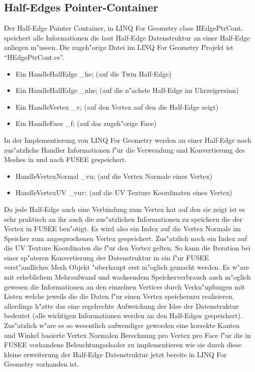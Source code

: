 \documentclass[pagesize, paper=a4, fontsize=12pt,titlepage=true, headings=small, headnosepline, abstractoff, liststotoc, nochapterprefix, plainheadsepline]{scrreprt}
\newcommand{\LFGS}{LINQ For Geometry }
\newcommand{\HES}{Half-Edge Datenstruktur }
\begin{document}
\subsection {Half-Edges Pointer-Container}
			Der Half-Edge Pointer Container, in \LFGS class HEdgePtrCont, speichert alle Informationen die laut \HES an einer Half-Edge anliegen m"ussen. Die zugeh"orige Datei im \LFGS Projekt ist "`HEdgePtrCont.cs"'.
\begin{itemize}
\item Ein HandleHalfEdge \_he; (auf die Twin Half-Edge)
\item Ein HandleHalfEdge \_nhe; (auf die n"achste Half-Edge im Uhrzeigersinn)
\item Ein HandleVertex \_v; (auf den Vertex auf den die Half-Edge zeigt)
\item Ein HandleFace \_f; (auf das zugeh"orige Face)
\end{itemize}

In der Implementierung von \LFGS werden an einer Half-Edge noch zus"atzliche Handler Informationen f"ur die Verwendung und Konvertierung des Meshes in und nach FUSEE gespeichert.

\begin{itemize}
\item HandleVertexNormal \_vn; (auf die Vertex Normale eines Vertex)
\item HandleVertexUV \_vuv; (auf die UV Texture Koordinaten eines Vertex)
\end{itemize}

Da jede Half-Edge auch eine Verbindung zum Vertex hat auf den sie zeigt ist es sehr praktisch an ihr auch die zus"atzlichen Informationen zu speichern die der Vertex in FUSEE ben"otigt. Es wird also ein Index auf die Vertex Normale im Speicher zum angesprochenen Vertex gespeichert. Zus"atzlich noch ein Index auf die UV Texture Koordinaten die f"ur den Vertex gelten. So kann die Iteration bei einer sp"ateren Konvertierung der Datenstruktur in ein f"ur FUSEE verst"andliches Mesh Objekt "uberhaupt erst m"oglich gemacht werden. Es w"are mit erheblichem Mehraufwand und wachsendem Speicherverbrauch auch m"oglich gewesen die Informationen an den einzelnen Vertices durch Verkn"upfungen mit Listen welche jeweils die die Daten f"ur einen Vertex speichernzu realisieren, allerdings h"atte das eine regelrechte Aufweichung der Idee der Datenstruktur bedeutet (alle wichtigen Informationen werden an den Half-Edges gespeichert). Zus"atzlich w"are es so wesentlich aufwendiger geworden eine korrekte Kanten und Winkel basierte Vertex Normalen Berechnung pro Vertex pro Face f"ur die in FUSEE vorhandene Beleuchtungsshader zu implementieren wie sie durch diese kleine erweiterung der \HES jetzt bereits in \LFGS vorhanden ist.
\end{document}
